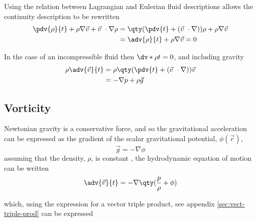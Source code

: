 Using the relation between Lagrangian and Eulerian fluid descriptions allows the continuity description to be rewritten
\begin{align}
  \label{eq:12}
  \pdv{\rho}{t} + \rho \nabla \vec{v} + \vec{v} \ \cdot \nabla \rho &= 
  \qty( \pdv{t} + (\vec{v} \ \cdot \nabla) ) \rho + \rho \nabla \vec{v} \nonumber\\ & =
  \adv{\rho}{t} + \rho \nabla \vec{v} = 0
\end{align}

In the case of an incompressible fluid then $\dv*{\rho}{t} = 0$, and
including gravity
\begin{align}%
  \label{eq:13}
  \rho \adv{\vec{v}}{t} &= \rho \qty( \pdv{t} + (\vec{v} \ \cdot \nabla) ) \vec{v} \nonumber\\
&= - \nabla p + \rho \vec{g}
\end{align}

\subsection{Vorticity}
\label{sec:vorticity}

Newtonian gravity is a conservative force, and so the gravitational
acceleration can be expressed as the gradient of the scalar
gravitational potential, $\phi(\vec{r})$,
\begin{equation}
  \label{eq:14}
  \vec{g} = - \nabla \phi
\end{equation}
assuming that the density, $\rho$, is constant , the hydrodynamic
equation of motion can be written
\begin{equation}
  \label{eq:15}
  \adv{\vec{v}}{t} =  - \nabla \qty( \frac{p}{\rho} + \phi )
\end{equation}

which, using the expression for a vector triple product, see appendix
\ref{sec:vect-triple-prod} can be expressed

